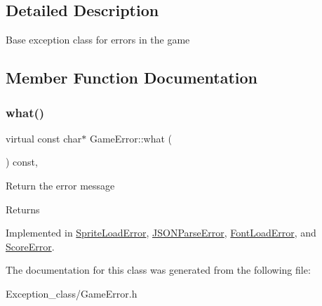 \subsection{Detailed Description}
Base exception class for errors in the game 

\subsection{Member Function Documentation}
\mbox{\label{classGameError_afbe93d6a2023f2824be2733aff9e86cb}} 
\subsubsection{\texorpdfstring{what()}{what()}}
{\footnotesize\ttfamily virtual const char$\ast$ Game\+Error\+::what (\begin{DoxyParamCaption}{ }\end{DoxyParamCaption}) const\hspace{0.3cm}{\ttfamily [pure virtual]}, {\ttfamily [noexcept]}}

Return the error message \begin{DoxyReturn}{Returns}

\end{DoxyReturn}


Implemented in \hyperlink{classSpriteLoadError_a7b51c2ea656c91b352514cd77aab0a38}{Sprite\+Load\+Error}, \hyperlink{classJSONParseError_a1f33b495974db21a050ede28eb0fe298}{J\+S\+O\+N\+Parse\+Error}, \hyperlink{classFontLoadError_a523f16150eb19d25ed5692512e6952f5}{Font\+Load\+Error}, and \hyperlink{classScoreError_a56e2018c9c0c9d34b482533aa983d37d}{Score\+Error}.



The documentation for this class was generated from the following file\+:\begin{DoxyCompactItemize}
\item 
Exception\+\_\+class/Game\+Error.\+h\end{DoxyCompactItemize}
